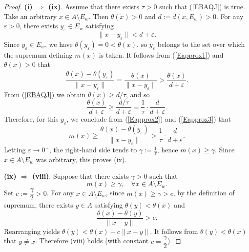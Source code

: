 \documentclass[11pt]{article}
\begin{document}
\begin{proof}
	 		\noindent\textbf{(i) $\Rightarrow$ (ix)}.
	 			 		Assume that there exists \(\tau>0\) such that   (\ref{EBAQJ}) is true.
	 	 	 		Take an arbitrary \(x\in A\setminus E_w\). Then \(\theta(x)>0\)  and	$	d:=d(x,E_w)>0 .$
	 		 For any \(\varepsilon>0\), there exists \(y_\varepsilon\in E_w\) satisfying
	 		\begin{equation}\label{Eapprox1}
	 			\|x-y_\varepsilon\|<d+\varepsilon .
	 		\end{equation}
	 		Since \(y_\varepsilon\in E_w\), we have \(\theta(y_\varepsilon)=0<\theta(x)\).  so \(y_\varepsilon\) belongs to the set over which the supremum defining \(m(x)\) is taken.   It follows from  (\ref{Eapprox1})   and    \(\theta(x)>0\)  that
	 		\begin{equation}\label{Eapprox2}
	 		\frac{\theta(x)-\theta(y_\varepsilon)}{\|x-y_\varepsilon\|}=\frac{\theta(x)}{\|x-y_\varepsilon\|}>\frac{\theta(x)}{d+\varepsilon}.
	 		\end{equation}
	 		 From (\ref{EBAQJ}) we obtain \(\theta(x)\ge d/\tau\), and so
	 	\begin{equation}\label{Eapprox3}
	 		\frac{\theta(x)}{d+\varepsilon}\ge\frac{d/\tau}{d+\varepsilon}=\frac{1}{\tau}\cdot\frac{d}{d+\varepsilon}.
	 		\end{equation}
	 		Therefore, for this \(y_\varepsilon\),  we conclude from  (\ref{Eapprox2})  and  (\ref{Eapprox3})  that
	 		\[
	 		m(x)\ge\frac{\theta(x)-\theta(y_\varepsilon)}{\|x-y_\varepsilon\|}>\frac{1}{\tau}\cdot\frac{d}{d+\varepsilon}.
	 		\]
	 		Letting \(\varepsilon\to0^{+}\), the right-hand side tends to \(\gamma:=\frac{1}{\tau}\),  hence \(m(x)\ge \gamma\). Since \(x\in A\setminus E_w\) was arbitrary, this proves (ix).
	 	 
	 		
	 			\noindent\textbf{(ix) $\Rightarrow$ (viii)}.
	 	Suppose   that there exists   \(\gamma >0\) such that
	 	\[
	 	m(x)\ge \gamma,\quad \forall x\in A\setminus E_w.
	 	\]
	 	Set \(c :=\dfrac{\gamma}{2}>0\). For any \(x\in A\setminus E_w\), since \(m(x)\ge \gamma > c\), by the definition of supremum, there exists \(y\in A\) satisfying \(\theta(y)<\theta(x)\) and
	 	\[
	 	\frac{\theta(x)-\theta(y)}{\|x-y\|} > c.
	 	\]
	 	Rearranging yields \(\theta(y) < \theta(x) - c \|x-y\|\).   It follows from \(\theta(y)<\theta(x)\)  that    \(y\neq x\). Therefore (viii) holds (with constant \(c =\dfrac{\gamma}{2}\)).
	 	

\end{proof}
\end{document}
